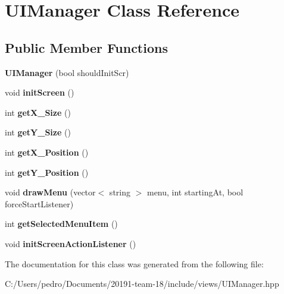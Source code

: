 \hypertarget{class_u_i_manager}{}\section{U\+I\+Manager Class Reference}
\label{class_u_i_manager}
\subsection*{Public Member Functions}
\begin{DoxyCompactItemize}
\item 
\mbox{\label{class_u_i_manager_a90921f00ec8b5b10c571173e8d183fb9}} 
{\bfseries U\+I\+Manager} (bool should\+Init\+Scr)
\item 
\mbox{\label{class_u_i_manager_a263527005952f257540fb88ad90520bd}} 
void {\bfseries init\+Screen} ()
\item 
\mbox{\label{class_u_i_manager_ad28df39a77eecb7a593815b648cffdae}} 
int {\bfseries get\+X\+\_\+\+Size} ()
\item 
\mbox{\label{class_u_i_manager_af82b5651661b605f0b7479e261682df5}} 
int {\bfseries get\+Y\+\_\+\+Size} ()
\item 
\mbox{\label{class_u_i_manager_ab605a6072f156ef96d913050fa1d6949}} 
int {\bfseries get\+X\+\_\+\+Position} ()
\item 
\mbox{\label{class_u_i_manager_a98d63d518a4f9e3b516fd08d780836c7}} 
int {\bfseries get\+Y\+\_\+\+Position} ()
\item 
\mbox{\label{class_u_i_manager_a516d1b113b99156e491018048cb4d247}} 
void {\bfseries draw\+Menu} (vector$<$ string $>$ menu, int starting\+At, bool force\+Start\+Listener)
\item 
\mbox{\label{class_u_i_manager_a8008637d2709dbed41f0cc897f207a6c}} 
int {\bfseries get\+Selected\+Menu\+Item} ()
\item 
\mbox{\label{class_u_i_manager_af299dbeade74ae92b8aaa63cba52860d}} 
void {\bfseries init\+Screen\+Action\+Listener} ()
\end{DoxyCompactItemize}


The documentation for this class was generated from the following file\+:\begin{DoxyCompactItemize}
\item 
C\+:/\+Users/pedro/\+Documents/20191-\/team-\/18/include/views/U\+I\+Manager.\+hpp\end{DoxyCompactItemize}
